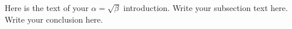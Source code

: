 \documentclass[preview, border=1pt, convert={outext=.png}]{standalone}
\begin{document}
	
Here is the text of your $\alpha = \sqrt{ \beta }$ introduction. \newline
Write your subsection text here. \newline
Write your conclusion here.
\end{document}

